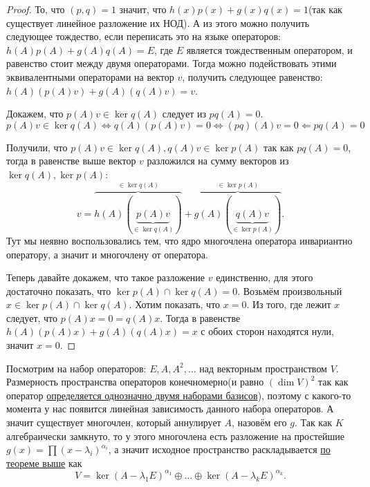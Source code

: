 \begin{proof}
    То, что $(p,q) = 1$ значит, что 
    $h(x)p(x) + g(x)q(x) = 1$(так как существует линейное разложение их НОД).
    А из этого можно получить следующее тождество, если переписать это на языке операторов:
    $h(A)p(A) + g(A) q(A) = E$, где $E$ является тождественным оператором, и равенство
    стоит между двумя операторами.
    Тогда можно подействовать этими эквивалентными операторами на вектор $v$, получить
    следующее равенство: $h(A)(p(A)v) + g(A)(q(A)v) = v$.

    Докажем, что $p(A)v\in \ker q(A)$ следует из $pq(A) = 0$.
    \[
        p(A)v\in \ker q(A) \Leftrightarrow q(A)(p(A)v) = 0 \Leftrightarrow (pq)(A)v = 0 \Leftarrow pq(A)=0
    \] 
    
    Получили, что $p(A)v\in \ker q(A), q(A)v\in \ker p(A)$ так как $pq(A)=0$,
    тогда в равенстве выше вектор $v$ разложился на сумму векторов из $\ker q(A), \ker p(A)$:
    \[
        v = 
        \overbrace{h(A)(\underbrace{p(A)v}_{\in \ker q(A)})}^{\in \ker q(A)} + 
        \overbrace{g(A)(\underbrace{q(A)v}_{\in \ker p(A)})}^{\in \ker p(A)}
    .\]
    Тут мы неявно
    воспользовались тем, что ядро многочлена оператора инвариантно оператору, а
    значит и многочлену от оператора.

    Теперь давайте докажем, что такое разложение $v$ единственно, для этого достаточно
    показать, что $\ker p(A) \cap \ker q(A) = 0$. Возьмём произвольный
    $x\in \ker p(A)\cap \ker q(A)$. Хотим показать, что $x = 0$.
    Из того, где лежит  $x$ следует, что $p(A)x = 0 = q(A)x$.
    Тогда в равенстве $h(A)(p(A)x) + g(A)(q(A)x) = x$ с обоих сторон находятся нули, 
    значит $x = 0$.
\end{proof}
\begin{follow}
    Посмотрим на набор операторов: $E, A, A^2, \dots$ над векторным пространством $V$.
    Размерность пространства операторов конечномерно(и равно $(\dim V)^2$ так как
    оператор \hyperref[thm:Линейное отображение однозначно задаётся двумя базисами]
    {определяется однозначно двумя наборами базисов}), поэтому
    с какого-то момента у нас появится линейная зависимость данного набора операторов.
    А значит существует многочлен, который аннулирует $A$, назовём его $g$.
    Так как $K$ алгебраически замкнуто, то у этого многочлена есть разложение на простейшие
    $g(x) = \prod (x - \lambda_i)^{\alpha_i}$, а значит исходное пространство раскладывается 
    \hyperref[thm:О аннулирующем операторе]{по теореме выше} как 
    \[
        V = \ker (A - \lambda_1 E)^{\alpha_1} \oplus \dots \oplus \ker (A - \lambda_k E)^{\alpha_k}
    .\]
\end{follow}
